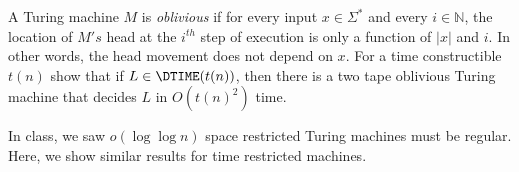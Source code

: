 \documentclass[12pt, a4paper,answers]{exam}
\newcommand{\N}{\mathbb{N}}
\begin{document}
\begin{questions}

A Turing machine $M$ is \textit{oblivious} if for every input $x \in \Sigma^*$ and every $i \in \N$, the location of $M's$ head at the $i^{th}$ step of execution is only a function of $|x|$ and $i$. In other words, the head movement does not depend on $x$. For a time constructible $t(n)$ show that if $L \in \DTIME(t(n))$, then there is a two tape oblivious Turing machine that decides $L$ in $O(t(n)^2)$ time.





In class, we saw $o(\log \log n)$ space restricted Turing machines must be regular. Here, we show similar results for time restricted machines.






\end{questions}
\end{document}
